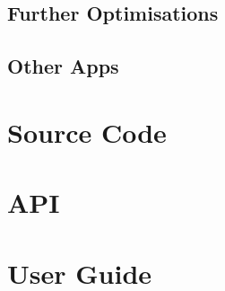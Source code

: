 \documentclass[12pt]{article}
\begin{document}
\subsection{Further Optimisations}

\subsection{Other Apps}


\newpage

\printbibliography[heading=bibintoc]


\newpage

\begin{appendices}


\section{Source Code}


\newpage

\section{API}


\newpage

\section{User Guide}

\end{appendices}


\newpage
\printindex
\end{document}
